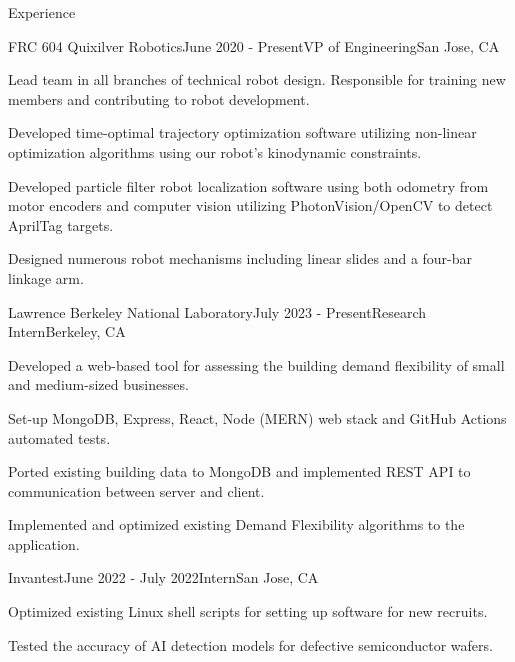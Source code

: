 \documentclass[
	11pt, %
]{tex/resume} %
\begin{document}
\begin{rSection}{Experience}

	\begin{rSubsection}{FRC 604 Quixilver Robotics}{June 2020 - Present}{VP of Engineering}{San Jose, CA}
		\item Lead team in all branches of technical robot design. Responsible for training new members and contributing to robot development.
        \item Developed time-optimal trajectory optimization software utilizing non-linear optimization algorithms using our robot’s kinodynamic constraints.
        \item Developed particle filter robot localization software using both odometry from motor encoders and computer vision utilizing PhotonVision/OpenCV to detect AprilTag targets.
        \item Designed numerous robot mechanisms including linear slides and a four-bar linkage arm.
        
	\end{rSubsection}


	\begin{rSubsection}{Lawrence Berkeley National Laboratory}{July 2023 - Present}{Research Intern}{Berkeley, CA}
		\item Developed a web-based tool for assessing the building demand flexibility of small and medium-sized businesses.
		\item Set-up MongoDB, Express, React, Node (MERN) web stack and GitHub Actions automated tests.
        \item Ported existing building data to MongoDB and implemented REST API to communication between server and client.
        \item Implemented and optimized existing Demand Flexibility algorithms to the application.
        
	\end{rSubsection}


	\begin{rSubsection}{Invantest}{June 2022 - July 2022}{Intern}{San Jose, CA}
		\item Optimized existing Linux shell scripts for setting up software for new recruits.
		\item Tested the accuracy of AI detection models for defective semiconductor wafers.
	\end{rSubsection}


\end{rSection}
\end{document}
